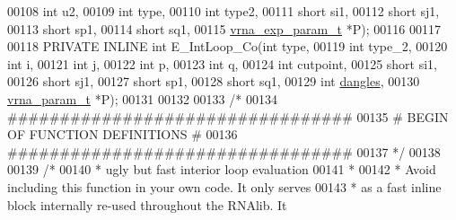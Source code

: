 \begin{DoxyCode}
00108                                         \textcolor{keywordtype}{int}               u2,
00109                                         \textcolor{keywordtype}{int}               type,
00110                                         \textcolor{keywordtype}{int}               type2,
00111                                         \textcolor{keywordtype}{short}             si1,
00112                                         \textcolor{keywordtype}{short}             sj1,
00113                                         \textcolor{keywordtype}{short}             sp1,
00114                                         \textcolor{keywordtype}{short}             sq1,
00115                                         \hyperlink{group__energy__parameters_structvrna__exp__param__s}{vrna\_exp\_param\_t}  *P);
00116 
00117 
00118 PRIVATE INLINE \textcolor{keywordtype}{int} E\_IntLoop\_Co(\textcolor{keywordtype}{int}           type,
00119                                 \textcolor{keywordtype}{int}           type\_2,
00120                                 \textcolor{keywordtype}{int}           i,
00121                                 \textcolor{keywordtype}{int}           j,
00122                                 \textcolor{keywordtype}{int}           p,
00123                                 \textcolor{keywordtype}{int}           q,
00124                                 \textcolor{keywordtype}{int}           cutpoint,
00125                                 \textcolor{keywordtype}{short}         si1,
00126                                 \textcolor{keywordtype}{short}         sj1,
00127                                 \textcolor{keywordtype}{short}         sp1,
00128                                 \textcolor{keywordtype}{short}         sq1,
00129                                 \textcolor{keywordtype}{int}           \hyperlink{group__model__details_ga72b511ed1201f7e23ec437e468790d74}{dangles},
00130                                 \hyperlink{group__energy__parameters_structvrna__param__s}{vrna\_param\_t}  *P);
00131 
00132 
00133 \textcolor{comment}{/*}
00134 \textcolor{comment}{ #################################}
00135 \textcolor{comment}{ # BEGIN OF FUNCTION DEFINITIONS #}
00136 \textcolor{comment}{ #################################}
00137 \textcolor{comment}{ */}
00138 
00139 \textcolor{comment}{/*}
00140 \textcolor{comment}{ *  ugly but fast interior loop evaluation}
00141 \textcolor{comment}{ *}
00142 \textcolor{comment}{ *  Avoid including this function in your own code. It only serves}
00143 \textcolor{comment}{ *  as a fast inline block internally re-used throughout the RNAlib. It}

\end{DoxyCode}
